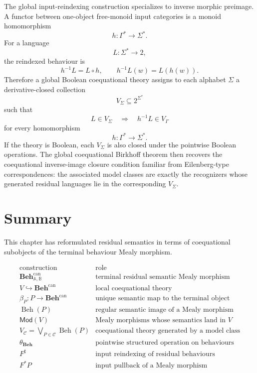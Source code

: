 The global input-reindexing construction specializes to inverse morphic
preimage. A functor between one-object free-monoid input categories is a monoid
homomorphism
\[
    h:\Gamma^*\to\Sigma^* .
\]
For a language
\[
    L:\Sigma^*\to 2,
\]
the reindexed behaviour is
\[
    h^{-1}L=L\circ h,
    \qquad
    h^{-1}L(w)=L(h(w)).
\]
Therefore a global Boolean coequational theory assigns to each alphabet
\(\Sigma\) a derivative-closed collection
\[
    V_\Sigma\subseteq 2^{\Sigma^*}
\]
such that
\[
    L\in V_\Sigma
    \quad\Longrightarrow\quad
    h^{-1}L\in V_\Gamma
\]
for every homomorphism
\[
    h:\Gamma^*\to\Sigma^*.
\]
If the theory is Boolean, each \(V_\Sigma\) is also closed under the pointwise
Boolean operations. The global coequational Birkhoff theorem then recovers the
coequational inverse-image closure condition familiar from Eilenberg-type
correspondences: the associated model classes are exactly the recognizers whose
generated residual languages lie in the corresponding \(V_\Sigma\).

\section{Summary}
\label{sec:coequations-birkhoff-summary}

This chapter has reformulated residual semantics in terms of coequational
subobjects of the terminal behaviour Mealy morphism.

\[
\begin{array}{c|l}
\text{construction} & \text{role} \\
\hline
\mathbf{Beh}^{\mathrm{can}}_{\mathbb A,\mathbb B}
&
\text{terminal residual semantic Mealy morphism}
\\
V\hookrightarrow \mathbf{Beh}^{\mathrm{can}}
&
\text{local coequational theory}
\\
\beta_P:P\to\mathbf{Beh}^{\mathrm{can}}
&
\text{unique semantic map to the terminal object}
\\
\operatorname{Beh}(P)
&
\text{regular semantic image of a Mealy morphism}
\\
\mathsf{Mod}(V)
&
\text{Mealy morphisms whose semantics land in }V
\\
V_{\mathcal C}
=
\bigvee_{P\in\mathcal C}\operatorname{Beh}(P)
&
\text{coequational theory generated by a model class}
\\
\theta_{\mathbf{Beh}}
&
\text{pointwise structured operation on behaviours}
\\
F^\sharp
&
\text{input reindexing of residual behaviours}
\\
F^*P
&
\text{input pullback of a Mealy morphism}
\end{array}
\]

